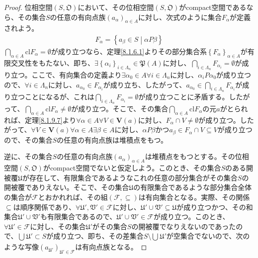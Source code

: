 \documentclass[dvipdfmx]{jsarticle}
\begin{document}
\begin{proof}
位相空間$\left( S,\mathfrak{O} \right)$において、その位相空間$\left( S,\mathfrak{O} \right)$がcompact空間であるなら、その集合$S$の任意の有向点族$\left( a_{\alpha} \right)_{\alpha \in A}$に対し、次式のように集合$F_{\alpha}$が定義されよう。
\begin{align*}
F_{\alpha} = \left\{ a_{\beta} \in S \middle| \alpha P\beta \right\}
\end{align*}
$\bigcap_{\alpha \in A} {{\mathrm{cl}}F_{\alpha}} = \emptyset$が成り立つなら、定理\ref{8.1.6.1}よりその部分集合系$\left\{ F_{\alpha} \right\}_{\alpha \in A}$が有限交叉性をもたない、即ち、$\exists\left\{ \alpha_{i} \right\}_{i \in \varLambda_{n}}\in \mathfrak{P}(A)$に対し、$\bigcap_{i \in \varLambda_{n}} F_{\alpha_{i}} = \emptyset$が成り立つ。ここで、有向集合の定義より$\exists\alpha_{0} \in A\forall i \in \varLambda_{n}$に対し、$\alpha_{i}P\alpha_{0}$が成り立つので、$\forall i \in \varLambda_{n}$に対し、$a_{\alpha_{0}} \in F_{\alpha_{i}}$が成り立ち、したがって、$a_{\alpha_{0}} \in \bigcap_{i \in \varLambda_{n}} F_{\alpha_{i}}$が成り立つことになるが、これは$\bigcap_{i \in \varLambda_{n}} F_{\alpha_{i}} = \emptyset$が成り立つことに矛盾する。したがって、$\bigcap_{\alpha \in A} {{\mathrm{cl}}F_{\alpha}} \neq \emptyset$が成り立つ。そこで、その集合$\bigcap_{\alpha \in A} {{\mathrm{cl}}F_{\alpha}}$の元$a$がとられれば、定理\ref{8.1.9.7}より$\forall\alpha \in A\forall V \in \mathbf{V}(a)$に対し、$F_{\alpha} \cap V \neq \emptyset$が成り立つ。したがって、$\forall V \in \mathbf{V}(a)\forall\alpha \in A\exists\beta \in A$に対し、$\alpha P\beta$かつ$a_{\beta} \in F_{\alpha} \cap V \subseteq V$が成り立つので、その集合$S$の任意の有向点族は堆積点をもつ。\par
逆に、その集合$S$の任意の有向点族$\left( a_{\alpha} \right)_{\alpha \in A}$は堆積点をもつとする。その位相空間$\left( S,\mathfrak{O} \right)$がcompact空間でないと仮定しよう。このとき、その集合$S$のある開被覆$\mathfrak{U}$が存在して、有限集合であるようなこれの任意の部分集合がその集合$S$の開被覆でありえない。そこで、その集合$\mathfrak{U}$の有限集合であるような部分集合全体の集合が$\mathcal{F}$とおかれれば、その組$\left( \mathcal{F, \subseteq} \right)$は有向集合となる。実際、その関係$\subseteq$は順序関係であり、$\forall\mathfrak{U}',\mathfrak{V}'\in \mathcal{F}$に対し、$\mathfrak{U}' \cup \mathfrak{V}'\subseteq \mathfrak{U}$が成り立つかつ、その和集合$\mathfrak{U}' \cup \mathfrak{V}'$も有限集合であるので、$\mathfrak{U}' \cup \mathfrak{V}'\in \mathcal{F}$が成り立つ。このとき、$\forall\mathfrak{U}'\in \mathcal{F}$に対し、その集合$\mathfrak{U}'$がその集合$S$の開被覆でなりえないのであったので、$\bigcup_{} \mathfrak{U}' \subset S$が成り立つ、即ち、その差集合$S \setminus \bigcup_{} \mathfrak{U}'$が空集合でないので、次のような写像$\left( a_{\mathfrak{U}'} \right)_{\mathfrak{U}'\in \mathcal{F}}$は有向点族となる。

\end{proof}
\end{document}
